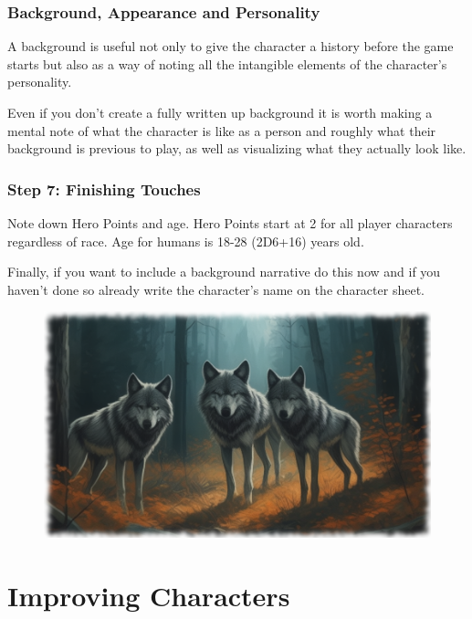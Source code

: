 \subsubsection{Background, Appearance and Personality}
A background is useful not only to give the character a history before the game starts but also as a way of noting all the intangible elements of the character’s personality. 

Even if you don’t create a fully written up background it is worth making a mental note of what the character is like as a person and roughly what their background is previous to play, as well as visualizing what they actually look like. 

\subsubsection{Step 7: Finishing Touches}
Note down Hero Points and age. Hero Points start at 2 for all player characters regardless of race. Age for humans is 18-28 (2D6+16) years old.

Finally, if you want to include a background narrative do this now and if you haven’t done so already write the character’s name on the character sheet.


\begin{figure}%
\begin{center}
  \includegraphics[scale=0.52]{img/ai-images/wolves-forest.png}
\end{center}
\end{figure}

\vspace{1em}

\section{Improving Characters}

